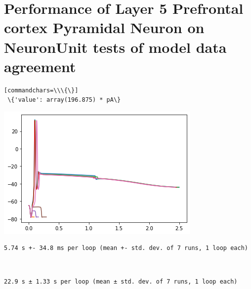 
    
\section{Performance of Layer 5 Prefrontal cortex Pyramidal Neuron on
NeuronUnit tests of model data
agreement}
    \begin{verbatim}[commandchars=\\\{\}]
 \{'value': array(196.875) * pA\}
    \end{verbatim}

    \begin{center}
    \includegraphics[width=0.7\linewidth]{figures/NU_BBP_fusion_L5PC_files/NU_BBP_fusion_L5PC_3_1.png}
    \end{center}

    \begin{verbatim}
5.74 s +- 34.8 ms per loop (mean +- std. dev. of 7 runs, 1 loop each)
    \end{verbatim}

    \begin{center}
    \end{center}
    { \hspace*{\fill} \\}
    
    \begin{Verbatim}[commandchars=\\\{\}]
22.9 s ± 1.33 s per loop (mean ± std. dev. of 7 runs, 1 loop each)
    \end{Verbatim}

    \begin{center}
    \end{center}
    { \hspace*{\fill} \\}
    
